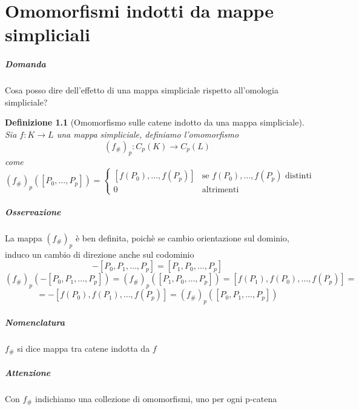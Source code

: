\documentclass[a4paper]{report}
\newtheorem{definition}{Definizione}
\newcommand{\ra}{\ensuremath{\rightarrow}}
\newcommand{\shrp}[1]{\ensuremath{({#1}_\#)_p}}
\begin{document}
\chapter{Omomorfismi indotti da mappe simpliciali}
\paragraph{Domanda} Cosa posso dire dell'effetto di una mappa simpliciale rispetto all'omologia simpliciale?
\begin{definition}[Omomorfismo sulle catene indotto da una mappa simpliciale]
    Sia $f:K\ra L$ una mappa simpliciale, definiamo l'omomorfismo
    \[
        \shrp{f}:C_p(K)\ra C_p(L)
    \]
    come
    \[
        \shrp{f}([P_0,\dots,P_p])=\begin{cases}
            [f(P_0),\dots,f(P_p)] & \text{se } f(P_0),\dots,f(P_p)\text{ distinti} \\
            0                     & \text{altrimenti}
        \end{cases}
    \]
\end{definition}
\paragraph{Osservazione} La mappa \shrp{f} è ben definita, poichè se cambio orientazione sul dominio, induco un cambio di direzione anche sul codominio
\[
    -[P_0,P_1,\dots,P_p]=[P_1,P_0,\dots,P_p]
\]
\[
    \shrp{f}(-[P_0,P_1,\dots,P_p])=\shrp{f}([P_1,P_0,\dots,P_p])=[f(P_1),f(P_0),\dots,f(P_p)]=
\]
\[
    =-[f(P_0),f(P_1),\dots,f(P_p)]=\shrp{f}([P_0,P_1,\dots,P_p])
\]
\paragraph{Nomenclatura} $f_\#$ si dice mappa tra catene indotta da $f$
\paragraph{Attenzione} Con $f_\#$ indichiamo una collezione di omomorfismi, uno per ogni p-catena
\end{document}
